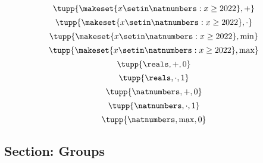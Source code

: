 {\begin{forslides}
\begin{equation}
    \end{equation}
    \begin{equation}
        \label{eq:example-nats22-plus}
        \tupp{ \makeset{x\setin\natnumbers: x \geq 2022 }, +}
    \end{equation}
    \begin{equation}
        \label{eq:example-nats22-mult}
        \tupp{ \makeset{x\setin\natnumbers: x \geq 2022 }, \cdot}
    \end{equation}
    \begin{equation}
        \label{eq:example-nats22-min}
        \tupp{ \makeset{x\setin\natnumbers: x \geq 2022 }, \min}
    \end{equation}
    \begin{equation}
        \label{eq:example-nats22-max}
        \tupp{ \makeset{x\setin\natnumbers: x \geq 2022 }, \max}
    \end{equation}
    \begin{equation}
        \label{eq:example-monoid-reals-plus-zero}
        \tupp{\reals, +, 0}
    \end{equation}
    \begin{equation}
        \label{eq:example-monoid-reals-mult-one}
        \tupp{\reals, \cdot, 1}
    \end{equation}
    \begin{equation}
        \label{eq:example-monoid-nats-plus-zero}
        \tupp{\natnumbers, +, 0}
    \end{equation}
    \begin{equation}
        \label{eq:example-monoid-nats-mult-one}
        \tupp{\natnumbers, \cdot,  1}
    \end{equation}
    \begin{equation}
        \label{eq:example-monoid-nats-max-zero}
        \tupp{\natnumbers, \max, 0}
    \end{equation}

    \subsection{Section: Groups}


\end{forslides}}
